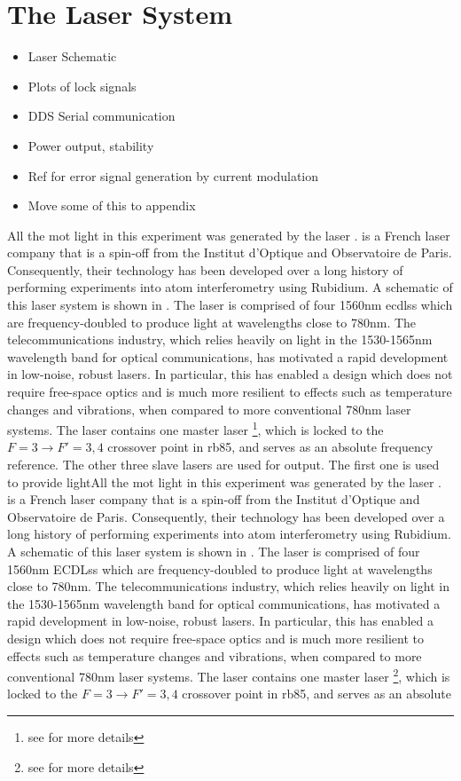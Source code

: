 \section{The \Muquans Laser System}\label{sec:setup_muquans}
\begin{itemize}
    \item Laser Schematic
    \item Plots of lock signals
    \item DDS Serial communication
    \item Power output, stability
    \item Ref for error signal generation by current modulation
    \item Move some of this to appendix
\end{itemize}
All the \ac{mot} light in this experiment was generated by the \Muquans laser \cite{muquansWebPage}. \Muquans is a French laser company that is a spin-off from the Institut d'Optique and Observatoire de Paris. Consequently, their technology has been developed over a long history of performing experiments into atom interferometry using Rubidium. A schematic of this laser system is shown in . The \Muquans laser is comprised of four 1560nm \acp{ecdls} which are frequency-doubled to produce light at wavelengths close to 780nm. The telecommunications industry, which relies heavily on light in the 1530-1565nm wavelength band for optical communications, has motivated a rapid development in low-noise, robust lasers. In particular, this has enabled a design which does not require free-space optics and is much more resilient to effects such as temperature changes and vibrations, when compared to more conventional 780nm laser systems. The \Muquans laser contains one master laser \footnote{see  for more details}, which is locked to the \(F = 3 \rightarrow F' = 3,4\) crossover point in \ac{rb85}, and serves as an absolute frequency reference. The other three slave lasers are used for output. The first one is used to provide lightAll the \ac{mot} light in this experiment was generated by the \Muquans laser \cite{muquansWebPage}. \Muquans is a French laser company that is a spin-off from the Institut d'Optique and Observatoire de Paris. Consequently, their technology has been developed over a long history of performing experiments into atom interferometry using Rubidium. A schematic of this laser system is shown in . The \Muquans laser is comprised of four 1560nm \acp{ECDLs} which are frequency-doubled to produce light at wavelengths close to 780nm. The telecommunications industry, which relies heavily on light in the 1530-1565nm wavelength band for optical communications, has motivated a rapid development in low-noise, robust lasers. In particular, this has enabled a design which does not require free-space optics and is much more resilient to effects such as temperature changes and vibrations, when compared to more conventional 780nm laser systems. The \Muquans laser contains one master laser \footnote{see  for more details}, which is locked to the \(F = 3 \rightarrow F' = 3,4\) crossover point in \ac{rb85}, and serves as an absolute 
